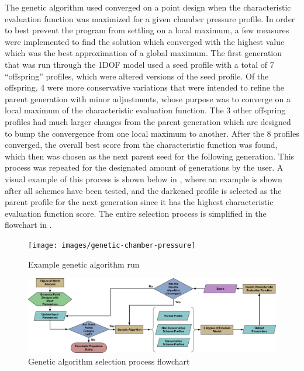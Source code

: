 The genetic algorithm used converged on a point design when the characteristic evaluation function was maximized for a given chamber pressure profile. In order to best prevent the program from settling on a local maximum, a few measures were implemented to find the solution which converged with the highest value which was the best approximation of a global maximum. The first generation that was run through the 1DOF model used a seed profile with a total of 7 ``offspring'' profiles, which were altered versions of the seed profile. Of the offspring, 4 were more conservative variations that were intended to refine the parent generation with minor adjustments, whose purpose was to converge on a local maximum of the characteristic evaluation function. The 3 other offspring profiles had much larger changes from the parent generation which are designed to bump the convergence from one local maximum to another. After the 8 profiles converged, the overall best score from the characteristic function was found, which then was chosen as the next parent seed for the following generation. This process was repeated for the designated amount of generations by the user. A visual example of this process is shown below in , where an example is shown after all schemes have been tested, and the darkened profile is selected as the parent profile for the next generation since it has the highest characteristic evaluation function score. The entire selection process is simplified in the flowchart in .

\begin{figure}
    \centering
    \texttt{[image: images/genetic-chamber-pressure]}
    \caption{Example genetic algorithm run}
    \label{figure:genetic-chamber-pressure}
\end{figure}


\begin{figure}
    \centering
    \includegraphics[width=\linewidth]{images/genetic-flowchart}
    \caption{Genetic algorithm selection process flowchart}
    \label{figure:genetic-flowchart}
\end{figure}


